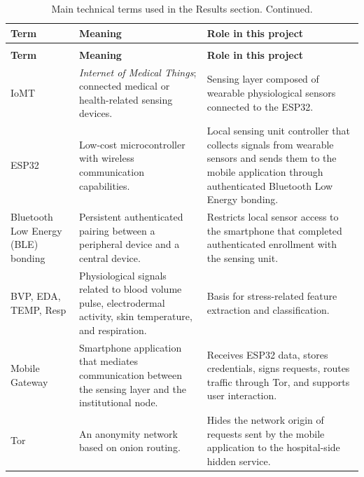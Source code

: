 \documentclass[12pt]{article}
\begin{document}
\begin{longtable}{p{2.5cm} p{4.7cm} p{6.4cm}}
\caption{Main technical terms used in the Results section.}
\label{tab:technical_terms_results} \\

\toprule
\textbf{Term} & \textbf{Meaning} & \textbf{Role in this project} \\ \midrule
\endfirsthead

\caption[]{Main technical terms used in the Results section. Continued.} \\

\toprule
\textbf{Term} & \textbf{Meaning} & \textbf{Role in this project} \\ \midrule
\endhead

\bottomrule
\endfoot

IoMT & \textit{Internet of Medical Things}; connected medical or health-related sensing devices. & Sensing layer composed of wearable physiological sensors connected to the ESP32. \\ \midrule

ESP32 & Low-cost microcontroller with wireless communication capabilities. & Local sensing unit controller that collects signals from wearable sensors and sends them to the mobile application through authenticated Bluetooth Low Energy bonding. \\ \midrule

Bluetooth Low Energy (BLE) bonding & Persistent authenticated pairing between a peripheral device and a central device. & Restricts local sensor access to the smartphone that completed authenticated enrollment with the sensing unit. \\ \midrule

BVP, EDA, TEMP, Resp & Physiological signals related to blood volume pulse, electrodermal activity, skin temperature, and respiration. & Basis for stress-related feature extraction and classification. \\ \midrule

Mobile Gateway & Smartphone application that mediates communication between the sensing layer and the institutional node. & Receives ESP32 data, stores credentials, signs requests, routes traffic through Tor, and supports user interaction. \\ \midrule

Tor & An anonymity network based on onion routing. & Hides the network origin of requests sent by the mobile application to the hospital-side hidden service. \\ \midrule


\end{longtable}
\end{document}
